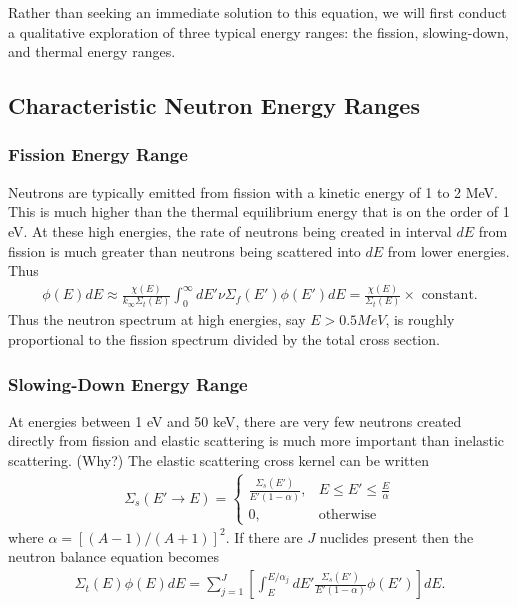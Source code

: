 \documentclass[11pt]{article}
\begin{document}
Rather than seeking an immediate solution to this equation, we will first conduct a qualitative exploration of three typical energy ranges: the fission, slowing-down, and thermal energy ranges.
\subsection{Characteristic Neutron Energy Ranges}
\label{sec:orgheadline29}
\subsubsection{Fission Energy Range}
\label{sec:orgheadline26}
Neutrons are typically emitted from fission with a kinetic energy of 1 to 2 MeV.  This is much higher than the thermal equilibrium energy that is on the order of 1 eV.  At these high energies, the rate of neutrons being created in interval \(dE\) from fission is much greater than neutrons being scattered into \(dE\) from lower energies.  Thus
\begin{align}
  \phi(E) dE \approx  \frac{\chi(E)}{k_\infty\Sigma_t(E)} \int_0^\infty dE' \nu\Sigma_f(E') \phi(E') dE = \frac{\chi(E)}{\Sigma_t(E)} \times \text{ constant}.
\end{align}
Thus the neutron spectrum at high energies, say \(E > 0.5 MeV\), is roughly proportional to the fission spectrum divided by the total cross section.

\subsubsection{Slowing-Down Energy Range}
\label{sec:orgheadline27}
At energies between 1 eV and 50 keV, there are very few neutrons created directly from fission and elastic scattering is much more important than inelastic scattering.  (Why?)  The elastic scattering cross kernel can be written
\begin{align}
  \Sigma_s(E' \rightarrow E) = 
  \begin{cases}
    \frac{\Sigma_s(E')}{E'(1-\alpha)}, & E \leq E' \leq \frac{E}{\alpha} \\
    0, & \text{otherwise}
  \end{cases}
\end{align}
where $\alpha = \left[(A-1)/(A+1)\right]^2$.  If there are $J$ nuclides present then the neutron balance equation becomes
\begin{align}
  \Sigma_t(E) \phi(E) dE
  = \sum_{j=1}^J \left[ \int_E^{E/\alpha_j} dE' \frac{\Sigma_s(E')}{E'(1-\alpha)} \phi(E') \right] dE.
\end{align}
\end{document}
